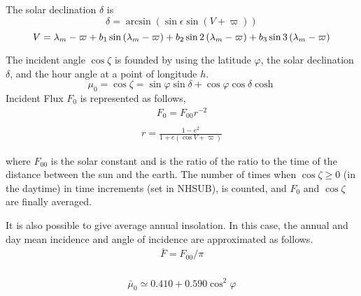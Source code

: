 The solar declination \(\delta\) is \begin{equation}
\delta=\arcsin (\sin \epsilon \sin (V+\varpi))
\end{equation} \begin{equation}
\\V=\lambda_{m}-\varpi+b_{1} \sin \left(\lambda_{m}-\varpi\right)+b_{2} \sin 2\left(\lambda_{m}-\varpi\right)+b_{3} \sin 3\left(\lambda_{m}-\varpi\right)
\end{equation}

The incident angle \(\cos \zeta\) is founded by using the latitude
\(\varphi\), the solar declination \(\delta\), and the hour angle at a
point of longitude \(h\). \begin{equation}
\mu_{0}=\cos \zeta=\sin \varphi \sin \delta+\cos \varphi \cos \delta \cosh
\end{equation} Incident Flux \(F_0\) is represented as follows, \begin{equation}
\begin{array}{c}
F_{0}=F_{00} r^{-2} \\
\end{array}
\end{equation} \begin{equation}
\begin{array}{c}
r=\frac{1-e^{2}}{1+e(\cos V+\varpi)}
\end{array}
\end{equation}

where \(F_{00}\) is the solar constant and is the ratio of the ratio to
the time of the distance between the sun and the earth. The number of
times when \(\cos \zeta \geq 0\) (in the daytime) in time increments
(set in NHSUB), is counted, and \(F_{0}\) and \(\cos \zeta\) are finally
averaged.

It is also possible to give average annual insolation. In this case, the
annual and day mean incidence and angle of incidence are approximated as
follows. \begin{equation}
\begin{array}{c}
\bar{F}=F_{00} / \pi \\
\end{array}
\end{equation}

\begin{equation}
\begin{array}{c}
\bar{\mu}_{0} \simeq 0.410+0.590 \cos ^{2} \varphi
\end{array}
\end{equation}

